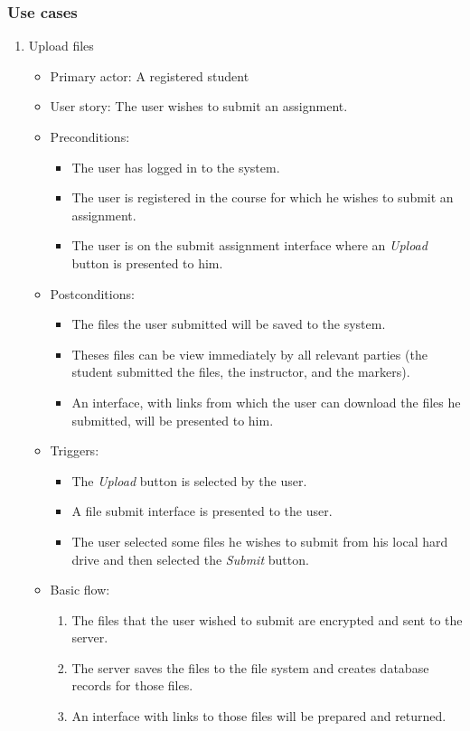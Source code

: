 \subsubsection{Use cases}
\begin{enumerate}

\item Upload files
\begin{itemize}
    \item Primary actor: A registered student
    \item User story: The user wishes to submit an assignment.
    \item Preconditions:
        \begin{itemize}
            \item The user has logged in to the system.
            \item The user is registered in the course for which he wishes to
                submit an assignment.
            \item The user is on the submit assignment interface where an
                \emph{Upload} button is presented to him.
        \end{itemize}
    \item Postconditions:
        \begin{itemize}
            \item The files the user submitted will be saved to the system.
            \item Theses files can be view immediately by all relevant parties
                (the student submitted the files, the instructor,
                and the markers).
            \item An interface, with links from which the user can
                download the files he submitted, will be presented
                to him.
        \end{itemize}
    \item Triggers:
        \begin{itemize}
            \item The \emph{Upload} button is selected by the user.
            \item A file submit interface is presented to the user.
            \item The user selected some files he wishes to submit from his
                local hard drive and then selected the \emph{Submit} button.
        \end{itemize}
    \item Basic flow:
        \begin{enumerate}
            \item The files that the user wished to submit are encrypted and
                sent to the server.
            \item The server saves the files to the file system and creates
                database records for those files.
            \item An interface with links to those files will be prepared and
                returned.
        \end{enumerate}
\end{itemize}


\end{enumerate}
